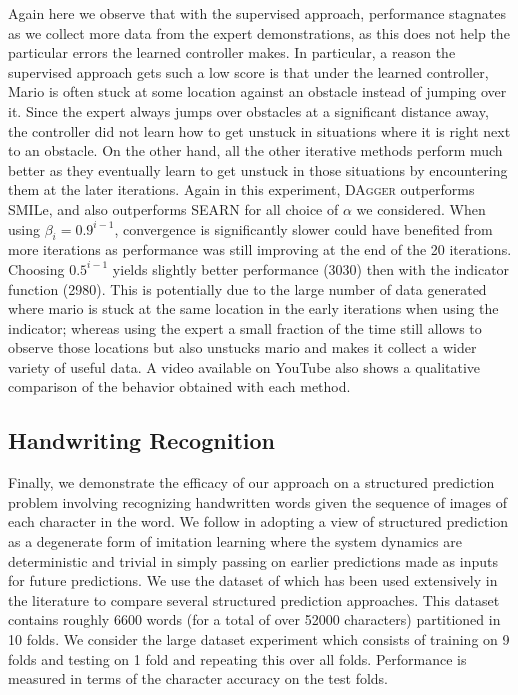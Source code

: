 \documentclass[twoside]{article}
\begin{document}
Again here we observe that with the supervised approach, performance stagnates as we collect more data from the expert demonstrations, as this does not help the particular errors the learned controller makes. In particular, a reason the supervised approach gets such a low score is that under the learned controller, Mario is often stuck at some location against an obstacle instead of jumping over it. Since the expert always jumps over obstacles at a significant distance away, the controller did not learn how to get unstuck in situations where it is right next to an obstacle. On the other hand, all the other iterative methods perform much better as they eventually learn to get unstuck in those situations by encountering them at the later iterations. Again in this experiment, \textsc{DAgger} outperforms SMILe, and also outperforms SEARN for all choice of $\alpha$ we considered. When using $\beta_i=0.9^{i-1}$, convergence is significantly slower could have benefited from more iterations as performance was still improving at the end of the 20 iterations. Choosing $0.5^{i-1}$ yields slightly better performance (3030) then with the indicator function (2980). This is potentially due to the large number of data generated where mario is stuck at the same location in the early iterations when using the indicator; whereas using the expert a small fraction of the time still allows to observe those locations but also unstucks mario and makes it collect a wider variety of useful data. A video available on YouTube \citep{Ross10b} also shows a qualitative comparison of the behavior obtained with each method.
%
\subsection{Handwriting Recognition}
%
Finally, we demonstrate the efficacy of our approach on a structured prediction problem involving recognizing handwritten words given the sequence of images of each character in the word. We follow \citet{Daume09} in adopting a view of structured prediction as a degenerate form of imitation learning where the system dynamics are deterministic and trivial in simply passing on earlier predictions made as inputs for future predictions.
We use the dataset of \citet{Taskar03} which has been used extensively in the literature to compare several structured prediction approaches. This dataset contains roughly 6600 words (for a total of over 52000 characters) partitioned in 10 folds. We consider the large dataset experiment which consists of training on 9 folds and testing on 1 fold and repeating this over all folds. Performance is measured in terms of the character accuracy on the test folds.
\end{document}
